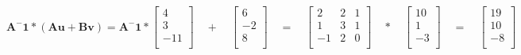 \documentclass[
  10pt,
  a4paper,
]{article}
\begin{document}
\begin{equation*}
\mathbf{A^-1 * (Au + Bv)} =\mathbf{A^-1} *\begin{bmatrix} 
  4 \\ 
  3 \\ 
-11 \\ 
\end{bmatrix}
\quad+\quad\begin{bmatrix} 
 6 \\ 
-2 \\ 
 8 \\ 
\end{bmatrix}
\quad=\quad\begin{bmatrix} 
 2 &  2 &  1 \\ 
 1 &  3 &  1 \\ 
-1 &  2 &  0 \\ 
\end{bmatrix}
\quad*\quad\begin{bmatrix} 
10 \\ 
 1 \\ 
-3 \\ 
\end{bmatrix}
\quad=\quad\begin{bmatrix} 
19 \\ 
10 \\ 
-8 \\ 
\end{bmatrix}
\end{equation*}
\end{document}
